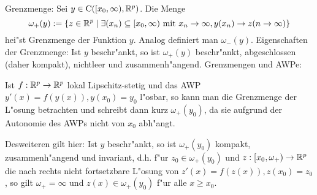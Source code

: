  Grenzmenge:{
  Sei $y\in{\rm C}([x_0,\infty),\mathbb R^p)$. Die Menge
  \[\omega_+(y):=\{z\in\mathbb R^p\mid \exists (x_n)\subseteq[x_0,\infty)\text{ mit }
      x_n\to\infty,y(x_n)\to z (n\to\infty)\}
    \]
  hei"st Grenzmenge der Funktion $y$. Analog definiert man $\omega_-(y)$.
  }
\remark Eigenschaften der Grenzmenge:{
  Ist $y$ beschr"ankt, so ist $\omega_+(y)$ beschr"ankt, abgeschlossen
  (daher kompakt), nichtleer und zusammenh"angend.
  }
\remark Grenzmengen und AWPe:{
  Ist $f:\mathbb R^p\to\mathbb R^p$ lokal Lipschitz-stetig und das AWP
  $y'(x)=f(y(x)),y(x_0)=y_0$ l"osbar, so kann man die Grenzmenge der
  L"osung betrachten und schreibt dann kurz $\omega_+(y_0)$, da sie
  aufgrund der Autonomie des AWPs nicht von $x_0$ abh"angt.
  
  Desweiteren gilt hier: Ist $y$ beschr"ankt, so ist $\omega_+(y_0)$ 
  kompakt, zusammenh"angend und invariant, d.h. f"ur $z_0\in\omega_+(y_0)$
  und $z:[x_0,\omega_+)\to\mathbb R^p$ die nach rechts nicht fortsetzbare 
  L"osung von $z'(x)=f(z(x)),z(x_0)=z_0$, so gilt $\omega_+=\infty$ und
  $z(x)\in\omega_+(y_0)$ f"ur alle $x\geq x_0$.
  }

